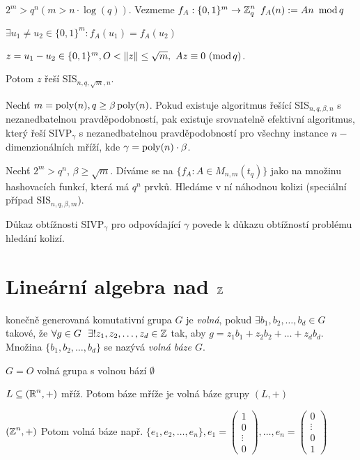 \begin{example}
$2^m > q^n (m > n \cdot \log (q))$. Vezmeme $f_A: \{0,1\}^m \rightarrow \Z^n_q \ f_A(n):=An\ \modulo q$

$\exists u_1 \neq u_2 \in \{0,1\}^m: f_A(u_1) = f_A(u_2)$

$z=u_1-u_2\in\{0,1\}^m, O<\|z\|\leq\sqrt{m},\ Az\equiv0\ (\operatorname{mod} q)$.

Potom $z$ řeší SIS$_{n,q,\sqrt{m},n}$.
\end{example}

\begin{theorem}[M. Ajatai, 1996]
Nechť $m=\operatorname{poly}(n), q\geq\beta\operatorname{poly}(n)$. Pokud existuje algoritmus řešící SIS$_{n,q,\beta,n}$ s nezanedbatelnou pravděpodobností, pak existuje srovnatelně efektivní algoritmus, který řeší SIVP$_\gamma$ s nezanedbatelnou pravděpodobností pro všechny instance $n-$dimenzionálních mříží, kde $\gamma=\operatorname{poly}(n)\cdot\beta$.
\end{theorem}

\begin{example}
Nechť $2^m>q^n$, $\beta\geq\sqrt{m}$.
Díváme se na $\{f_A: A \in M_{n,m}(t_q)\}$ jako na množinu hashovacích funkcí, která má $q^n$ prvků. Hledáme v ní náhodnou kolizi (speciální případ SIS$_{n,q, \beta,m}$).

Důkaz obtížnosti SIVP$_\gamma$ pro odpovídající $\gamma$ povede k důkazu obtížností problému hledání kolizí.
\end{example}

\section{\texorpdfstring{Lineární algebra nad $\operatorname{\mathbb{Z}}$}{Linearni algebra na Z}}
\begin{definition}
konečně generovaná komutativní grupa $G$ je \emph{volná}, pokud $\exists b_1, b_2, \dots, b_d \in G$ takové, že $\forall g \in G\ \ \exists ! z_1, z_2, \dots, z_d \in \operatorname{\mathbb{Z}}$ tak, aby $g = z_1 b_1 +  z_2b_2 + \dots + z_d b_d$. Množina $\{b_1,b_2, \dots, b_d\}$ se nazývá \emph{volná báze $G$}.
\end{definition}

\begin{note}
$G = O$ volná grupa s volnou bází $\emptyset$

$L \subseteq (\operatorname{\mathbb{R}}^n, +)$ mříž. Potom báze mříže je volná báze grupy $(L,+)$

$(\operatorname{\mathbb{Z}}^n, +)$ Potom volná báze např. $\{e_1, e_2, \dots , e_n\}, e_1 = \begin{pmatrix}
1 \\
0 \\
\vdots \\
0
\end{pmatrix}, \dots,
e_n=\begin{pmatrix}
0 \\
\vdots \\
0 \\
1
\end{pmatrix}$
\end{note}


